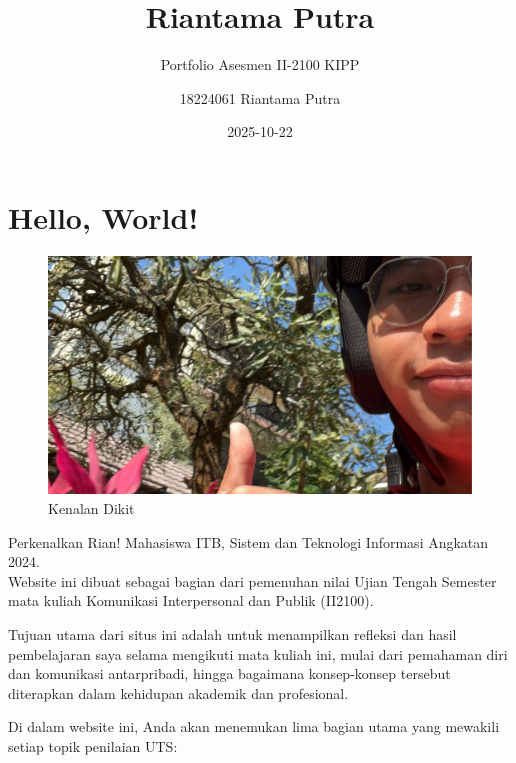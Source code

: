 \documentclass[
  letterpaper,
  DIV=11,
  numbers=noendperiod]{scrreprt}
\title{Riantama Putra}
\subtitle{Portfolio Asesmen II-2100 KIPP}
\author{18224061 Riantama Putra}
\date{2025-10-22}
\renewcommand*\contentsname{Table of contents}
\newcommand\contentsname{Table of contents}
\begin{document}
\maketitle

\renewcommand*\contentsname{Table of contents}
{
\hypersetup{linkcolor=}
\setcounter{tocdepth}{2}
\tableofcontents
}


\chapter*{Hello, World!}\label{hello-world}


\begin{figure}[H]

{\centering \includegraphics[width=9.5\linewidth,height=\textheight,keepaspectratio]{images/rian.jpeg}

}

\caption{Kenalan Dikit}

\end{figure}%

Perkenalkan Rian! Mahasiswa ITB, Sistem dan Teknologi Informasi Angkatan
2024.\\
Website ini dibuat sebagai bagian dari pemenuhan nilai Ujian Tengah
Semester mata kuliah Komunikasi Interpersonal dan Publik (II2100).

Tujuan utama dari situs ini adalah untuk menampilkan refleksi dan hasil
pembelajaran saya selama mengikuti mata kuliah ini, mulai dari pemahaman
diri dan komunikasi antarpribadi, hingga bagaimana konsep-konsep
tersebut diterapkan dalam kehidupan akademik dan profesional.

Di dalam website ini, Anda akan menemukan lima bagian utama yang
mewakili setiap topik penilaian UTS:
\end{document}
